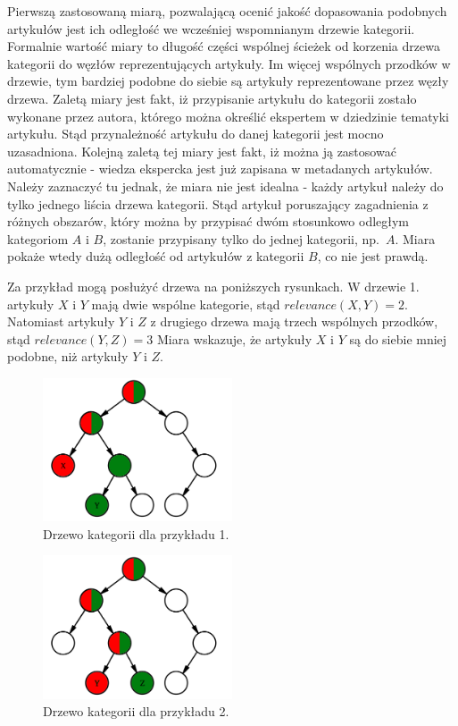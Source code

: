 \documentclass[pl]{minipw} %
\begin{document}
Pierwszą zastosowaną miarą, pozwalającą ocenić jakość dopasowania podobnych artykułów jest ich odległość we wcześniej wspomnianym drzewie kategorii. Formalnie wartość miary to długość części wspólnej ścieżek od korzenia drzewa kategorii do węzłów reprezentujących artykuły. Im więcej wspólnych przodków w drzewie, tym bardziej podobne do siebie są artykuły reprezentowane przez węzły drzewa. Zaletą miary jest fakt, iż przypisanie artykułu do kategorii zostało wykonane przez autora, którego można określić ekspertem w dziedzinie tematyki artykułu. Stąd przynależność artykułu do danej kategorii jest mocno uzasadniona. Kolejną zaletą tej miary jest fakt, iż można ją zastosować automatycznie - wiedza ekspercka jest już zapisana w metadanych artykułów. Należy zaznaczyć tu jednak, że miara nie jest idealna - każdy artykuł należy do tylko jednego liścia drzewa kategorii. Stąd artykuł poruszający zagadnienia z różnych obszarów, który można by przypisać dwóm stosunkowo odległym kategoriom $A$ i $B$, zostanie przypisany tylko do jednej kategorii, np.~$A$. Miara pokaże wtedy dużą odległość od artykułów z kategorii $B$, co nie jest prawdą.

Za przykład mogą posłużyć drzewa na poniższych rysunkach. W drzewie 1. artykuły $X$ i $Y$ mają dwie wspólne kategorie, stąd $relevance(X, Y) = 2$. Natomiast artykuły $Y$ i $Z$ z drugiego drzewa mają trzech wspólnych przodków, stąd $relevance(Y, Z)=3$ Miara wskazuje, że artykuły $X$ i $Y$ są do siebie mniej podobne, niż artykuły $Y$ i $Z$.

\begin{figure}[H]
	\centering
	\includegraphics[width=0.5\textwidth]{img/cat_tree_example_1.png}
	\caption{Drzewo kategorii dla przykładu 1.}
\end{figure}
\begin{figure}[H]
	\centering
	\includegraphics[width=0.5\textwidth]{img/cat_tree_example_2.png}
	\caption{Drzewo kategorii dla przykładu 2.}
	\label{fig:warstwy}
\end{figure}
\end{document}
